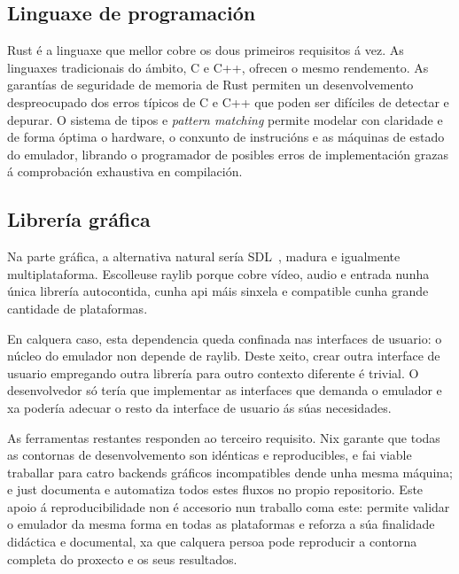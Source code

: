 \subsection{Linguaxe de programación}
Rust é a linguaxe que mellor cobre os dous primeiros requisitos á vez.
As linguaxes tradicionais do ámbito, C e C++, ofrecen o mesmo rendemento.
As garantías de seguridade de memoria de Rust permiten un desenvolvemento despreocupado
dos erros típicos de C e C++ que poden ser difíciles de detectar e depurar.
O sistema de tipos e \textit{pattern matching} permite modelar con claridade e de forma
óptima o hardware, o conxunto de instrucións e as máquinas de estado do emulador,
librando o programador de posibles erros de implementación grazas á comprobación exhaustiva en compilación. 

\subsection{Librería gráfica}
Na parte gráfica, a alternativa natural sería SDL~\cite{Sdl}, madura e igualmente multiplataforma.
Escolleuse raylib porque cobre vídeo, audio e entrada nunha única librería autocontida,
cunha \acrshort{api} máis sinxela e compatible cunha grande cantidade de plataformas.

En calquera caso, esta dependencia queda confinada nas interfaces de usuario:
o núcleo do emulador non depende de raylib.
Deste xeito, crear outra interface de usuario empregando outra librería para outro contexto diferente
é trivial. O desenvolvedor só tería que implementar as interfaces que demanda o emulador
e xa podería adecuar o resto da interface de usuario ás súas necesidades.

As ferramentas restantes responden ao terceiro requisito.
Nix garante que todas as contornas de desenvolvemento son idénticas e reproducibles,
e fai viable traballar para catro backends gráficos incompatibles dende unha mesma máquina;
e just documenta e automatiza todos estes fluxos no propio repositorio.
Este apoio á reproducibilidade non é accesorio nun traballo coma este:
permite validar o emulador da mesma forma en todas as plataformas
e reforza a súa finalidade didáctica e documental,
xa que calquera persoa pode reproducir a contorna completa do proxecto e os seus resultados.
